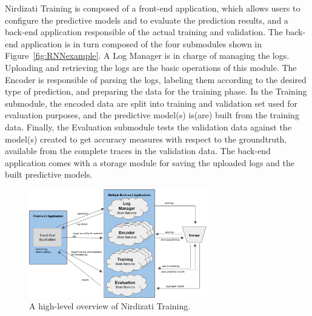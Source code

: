 \documentclass[runningheads,a4paper]{llncs}
\begin{document}
Nirdizati Training is composed of a front-end application, which allows users to configure the predictive models
and to evaluate the prediction results, and a back-end application responsible of the actual training and validation.
The back-end application is in turn composed of the four submodules shown in Figure~\ref{fig:RNNexample}.
A Log Manager is in charge of managing the logs. Uploading and retrieving the logs are the basic operations
of this module. The Encoder is responsible of parsing the logs, labeling them according to the desired type of prediction,
 and preparing the data for the training phase.
In the Training submodule, the encoded data are split into training and validation set used for evaluation purposes,
and the predictive model(s) is(are) built from the training data. Finally, the Evaluation submodule
tests the validation data against the model(s) created to get accuracy measures with respect to the groundtruth,
available from the complete traces in the validation data.
The back-end application comes with a storage module for saving the uploaded logs and the built predictive models.


\begin{figure}[t]%
	\centering
	 \includegraphics[width=0.7\textwidth]{img/nirdizati-training-architecture-rev}
	\caption{A high-level overview of Nirdizati Training.}
	\label{fig:nirdizati-training}
\end{figure}
\end{document}
